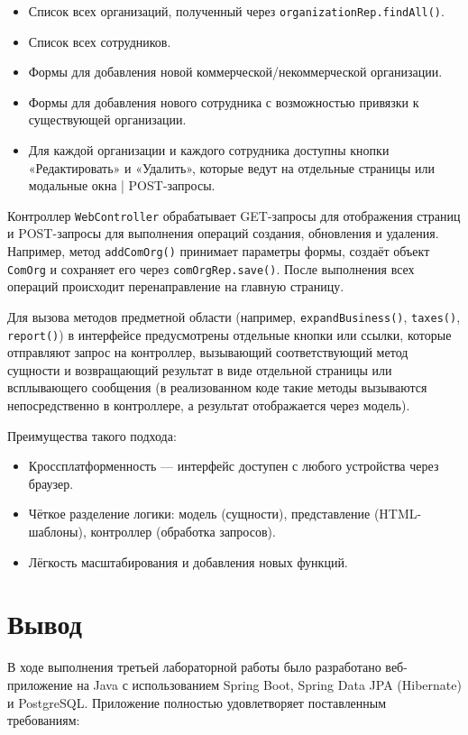 \documentclass[oneside,a4paper,14pt]{extarticle}
\begin{document}
\begin{itemize}
	\item Список всех организаций, полученный через \texttt{organizationRep.findAll()}.
	\item Список всех сотрудников.
	\item Формы для добавления новой коммерческой/некоммерческой организации.
	\item Формы для добавления нового сотрудника с возможностью привязки к существующей организации.
	\item Для каждой организации и каждого сотрудника доступны кнопки «Редактировать» и «Удалить», которые ведут на отдельные страницы или модальные окна | POST-запросы.
\end{itemize}


Контроллер \texttt{WebController} обрабатывает GET-запросы для отображения страниц и POST-запросы для выполнения операций создания, обновления и удаления. Например, метод \texttt{addComOrg()} принимает параметры формы, создаёт объект \texttt{ComOrg} и сохраняет его через \texttt{comOrgRep.save()}. После выполнения всех операций происходит перенаправление на главную страницу.

Для вызова методов предметной области (например, \texttt{expandBusiness()}, \texttt{taxes()}, \texttt{report()}) в интерфейсе предусмотрены отдельные кнопки или ссылки, которые отправляют запрос на контроллер, вызывающий соответствующий метод сущности и возвращающий результат в виде отдельной страницы или всплывающего сообщения (в реализованном коде такие методы вызываются непосредственно в контроллере, а результат отображается через модель).

Преимущества такого подхода:
\begin{itemize}
	\item Кроссплатформенность — интерфейс доступен с любого устройства через браузер.
	\item Чёткое разделение логики: модель (сущности), представление (HTML-шаблоны), контроллер (обработка запросов).
	\item Лёгкость масштабирования и добавления новых функций.
\end{itemize}

\newpage

\section*{Вывод}

В ходе выполнения третьей лабораторной работы было разработано веб-приложение на Java с использованием Spring Boot, Spring Data JPA (Hibernate) и PostgreSQL. Приложение полностью удовлетворяет поставленным требованиям:
\end{document}

